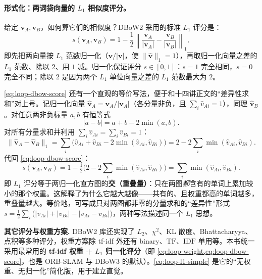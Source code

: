 \paragraph{形式化：两词袋向量的 $L_1$ 相似度评分。}
给定 $\boldsymbol v_A,\boldsymbol v_B$，如何算它们的相似度？DBoW2 采用的标准 $L_1$ 评分是\cite{galvez2012bags}：
\begin{equation}
  s(\boldsymbol v_A,\boldsymbol v_B)=1-\frac{1}{2}\left\lVert\frac{\boldsymbol v_A}{\lvert\boldsymbol v_A\rvert}-\frac{\boldsymbol v_B}{\lvert\boldsymbol v_B\rvert}\right\rVert_1,
  \label{eq:loop-dbow-score}
\end{equation}
即先把两向量按 $L_1$ 范数归一化（$\boldsymbol v/\lvert\boldsymbol v\rvert$，使 $\lVert\widehat{\boldsymbol v}\rVert_1=1$），再取归一化向量之差的 $L_1$ 范数、除以 $2$、用 $1$ 减。归一化保证评分 $s\in[0,1]$：$s=1$ 完全相同，$s=0$ 完全不同；除以 $2$ 是因为两个 $L_1$ 单位向量之差的 $L_1$ 范数最大为 $2$。

\begin{derivation}
\cref{eq:loop-dbow-score} 还有一个直观的等价写法，便于和十四讲正文的“差异性求和”对上号。记归一化向量 $\widehat{\boldsymbol v}_A=\boldsymbol v_A/\lvert\boldsymbol v_A\rvert$（各分量非负，且 $\sum_i\widehat v_{Ai}=1$），同理 $\widehat{\boldsymbol v}_B$。对任意两非负标量 $a,b$ 有恒等式
\[
  \lvert a-b\rvert = a+b-2\min(a,b).
\]
对所有分量求和并利用 $\sum_i\widehat v_{Ai}=\sum_i\widehat v_{Bi}=1$：
\[
  \lVert\widehat{\boldsymbol v}_A-\widehat{\boldsymbol v}_B\rVert_1
  =\sum_i\big(\widehat v_{Ai}+\widehat v_{Bi}-2\min(\widehat v_{Ai},\widehat v_{Bi})\big)
  =2-2\sum_i\min(\widehat v_{Ai},\widehat v_{Bi}).
\]
代回 \cref{eq:loop-dbow-score}：
\[
  s(\boldsymbol v_A,\boldsymbol v_B)=1-\tfrac12\Big(2-2\textstyle\sum_i\min(\widehat v_{Ai},\widehat v_{Bi})\Big)
  =\sum_i\min(\widehat v_{Ai},\widehat v_{Bi}).
\]
即 $L_1$ 评分等于两归一化直方图的\textbf{交（重叠量）}：只在两图\emph{都}含有的单词上累加较小的那个权重。这解释了为什么它越大越像——共有的、且权重都高的单词越多，重叠量越大。等价地，可写成只对两图都非零的分量求和的“差异性”形式 $s=\tfrac12\sum_i\big(\lvert v_{Ai}\rvert+\lvert v_{Bi}\rvert-\lvert v_{Ai}-v_{Bi}\rvert\big)$，两种写法描述同一个 $L_1$ 思想。
\end{derivation}

\begin{note}
\textbf{其它评分与权重方案.}\;
DBoW2 库还实现了 $L_2$、$\chi^2$、KL 散度、Bhattacharyya、点积等多种评分，权重方案除 tf-idf 外还有 binary、$\mathrm{TF}$、$\mathrm{IDF}$ 单用等\cite{galvez2012bags}。本书统一采用最常用的 \textbf{tf-idf 权重 + $L_1$ 归一化评分}（即 \cref{eq:loop-weight,eq:loop-dbow-score}，也是 ORB-SLAM\cite{murartal2015orbslam} 与 DBoW3 的默认）。\cref{eq:loop-l1-simple} 是它的“无权重、无归一化”简化版，用于建立直觉。
\end{note}

